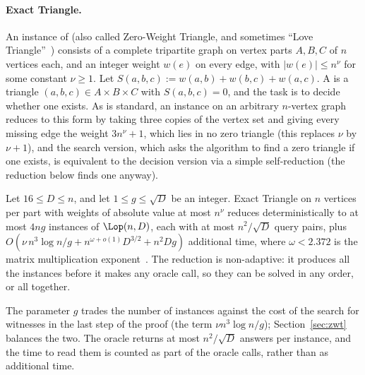 \paragraph{Exact Triangle.}
An instance of  (also called Zero-Weight Triangle, and sometimes ``Love Triangle''~\cite{GP18}) consists of a complete tripartite graph on vertex parts $A,B,C$ of $n$ vertices each, and an integer weight $w(e)$ on every edge, with $|w(e)|\le n^\nu$ for some constant $\nu\ge1$. Let $S(a,b,c):=w(a,b)+w(b,c)+w(a,c)$. A  is a triangle $(a,b,c)\in A\times B\times C$ with $S(a,b,c)=0$, and the task is to decide whether one exists. As is standard, an instance on an arbitrary $n$-vertex graph reduces to this form by taking three copies of the vertex set and giving every missing edge the weight $3n^\nu+1$, which lies in no zero triangle (this replaces $\nu$ by $\nu+1$), and the search version, which asks the algorithm to find a zero triangle if one exists, is equivalent to the decision version via a simple self-reduction (the reduction below finds one anyway).

\begin{theorem}\label{thm:red}
Let $16\le D\le n$, and let $1\le g\le\sqrt D$ be an integer. Exact Triangle on $n$ vertices per part with weights of absolute value at most $n^\nu$ reduces deterministically to at most $4ng$ instances of $\Lop(n,D)$, each with at most $n^2/\sqrt D$ query pairs, plus $O(\nu\,n^3\log n/g+n^{\omega+o(1)}D^{3/2}+n^2Dg)$ additional time, where $\omega<2.372$ is the matrix multiplication exponent~\cite{ADVXXZ25}. The reduction is non-adaptive: it produces all the instances before it makes any oracle call, so they can be solved in any order, or all together.
\end{theorem}

The parameter $g$ trades the number of instances against the cost of the search for witnesses in the last step of the proof (the term $\nu n^3\log n/g$); Section~\ref{sec:zwt} balances the two. The oracle returns at most $n^2/\sqrt D$ answers per instance, and the time to read them is counted as part of the oracle calls, rather than as additional time.

